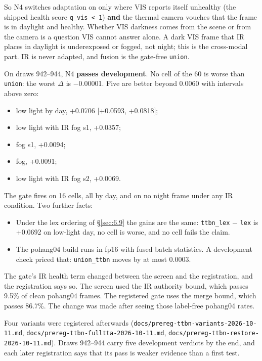 \documentclass[10pt]{article}
\begin{document}
So N4 switches adaptation on only where VIS reports itself unhealthy (the shipped health score \texttt{q\_\allowbreak{}vis < 1}) \textbf{and} the thermal camera vouches that the frame is in daylight and healthy. Whether VIS darkness comes from the scene or from the camera is a question VIS cannot answer alone. A dark VIS frame that IR places in daylight is underexposed or fogged, not night; this is the cross-modal part. IR is never adapted, and fusion is the gate-free \texttt{union}.

On draws 942--944, N4 \textbf{passes development}. No cell of the 60 is worse than \texttt{union}: the worst $\Delta$ is $-$0.00001. Five are better beyond 0.0060 with intervals above zero:
\begin{itemize}
\item low light by day, +0.0706 [+0.0593, +0.0818];
\item low light with IR fog s1, +0.0357;
\item fog s1, +0.0094;
\item fog, +0.0091;
\item low light with IR fog s2, +0.0069.
\end{itemize}

The gate fires on 16 cells, all by day, and on no night frame under any IR condition. Two further facts:
\begin{itemize}
\item Under the lex ordering of \S\ref{sec:6.9} the gains are the same: \texttt{ttbn\_\allowbreak{}lex} $-$ \texttt{lex} is +0.0692 on low-light day, no cell is worse, and no cell fails the claim.
\item The pohang04 build runs in fp16 with fused batch statistics. A development check priced that: \texttt{union\_\allowbreak{}ttbn} moves by at most 0.0003.
\end{itemize}

The gate's IR health term changed between the screen and the registration, and the registration says so. The screen used the IR authority bound, which passes 9.5\% of clean pohang04 frames. The registered gate uses the merge bound, which passes 86.7\%. The change was made after seeing those label-free pohang04 rates.

Four variants were registered afterwards (\texttt{docs/\allowbreak{}prereg-ttbn-variants-2026-10-11.md}, \texttt{docs/\allowbreak{}prereg-ttbn-fulltta-2026-10-11.md}, \texttt{docs/\allowbreak{}prereg-ttbn-restore-2026-10-11.md}). Draws 942--944 carry five development verdicts by the end, and each later registration says that its pass is weaker evidence than a first test.
\end{document}

